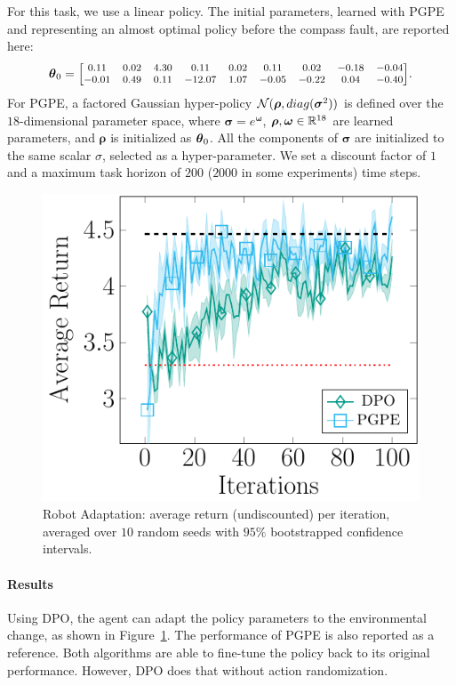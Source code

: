For this task, we use a linear policy. The initial parameters, learned with \ac{PGPE} and representing an almost optimal policy before the compass fault, are reported here:
\[
\vtheta_{0} = 
\medmath{\begin{bmatrix}
0.11& 0.02& 4.30& 0.11& 0.02& 0.11& 0.02& -0.18& -0.04\\
-0.01& 0.49& 0.11& -12.07& 1.07& -0.05& -0.22& 0.04& -0.40\\
\end{bmatrix}}.
\]
For \ac{PGPE}, a factored Gaussian hyper-policy $\mathcal{N}(\boldsymbol{\rho},\mathop{diag}(\boldsymbol{\sigma}^2))$ is defined over the $18$-dimensional parameter space, where $\boldsymbol{\sigma}=e^{\boldsymbol{\omega}}$, $\boldsymbol{\rho},\boldsymbol{\omega}\in\mathbb{R}^{18}$ are learned parameters, and $\boldsymbol{\rho}$ is initialized as $\boldsymbol{\theta}_{0}$. All the components of $\boldsymbol{\sigma}$ are initialized to the same scalar $\sigma$, selected as a hyper-parameter.
We set a discount factor of $1$ and a maximum task horizon of $200$ ($2000$ in some experiments) time steps.
\begin{figure}[t]
	\centering
	\includegraphics[scale=1]{plots/recover.pdf}
	\caption{Robot Adaptation: average return (undiscounted) per iteration, averaged over $10$ random seeds with $95\%$ bootstrapped confidence intervals.}
	\label{fig:recover}
\end{figure}

\paragraph{Results}
Using \ac{DPO}, the agent can adapt the policy parameters to the environmental change, as shown in Figure~\ref{fig:recover}. The performance of \ac{PGPE} is also reported as a reference. Both algorithms are able to fine-tune the policy back to its original performance. However, \ac{DPO} does that without action randomization.

